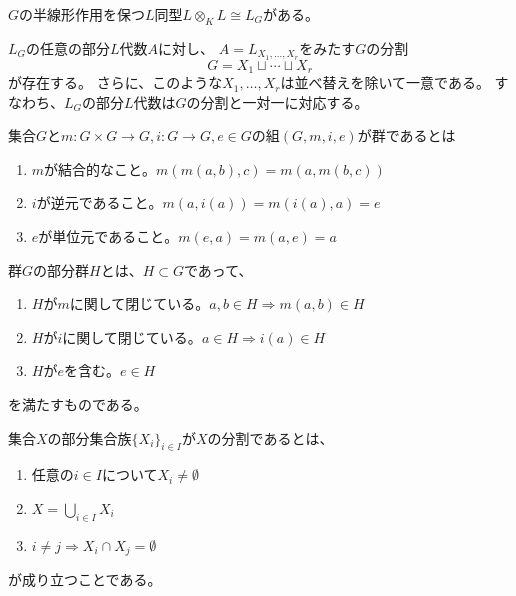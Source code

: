 \begin{proposition}\label{ext-self}
    $G$の半線形作用を保つ$L$同型$L\otimes_KL\cong L_G$がある。
\end{proposition}

\begin{proposition}\label{subalgebra-decomp}
    $L_G$の任意の部分$L$代数$A$に対し、
    $A=L_{X_1,\ldots,X_r}$をみたす$G$の分割$$G=X_1\sqcup \cdots\sqcup X_r$$が存在する。
    さらに、このような$X_1,\ldots,X_r$は並べ替えを除いて一意である。
    すなわち、$L_G$の部分$L$代数は$G$の分割と一対一に対応する。
\end{proposition}

\begin{definition}\label{group-def}
    \leanok
    集合$G$と$m:G\times G\to G, i:G\to G, e\in G$の組$(G,m,i,e)$が群であるとは
    \begin{enumerate}
        \item $m$が結合的なこと。$m(m(a,b),c)=m(a,m(b,c))$
        \item $i$が逆元であること。$m(a,i(a))=m(i(a),a)=e$
        \item $e$が単位元であること。$m(e,a)=m(a,e)=a$
    \end{enumerate}
\end{definition}

\begin{definition}\label{subgroup-def}
    \leanok
    群$G$の部分群$H$とは、$H\subset G$であって、
    \begin{enumerate}
        \item $H$が$m$に関して閉じている。$a,b\in H\Rightarrow m(a,b)\in H$
        \item $H$が$i$に関して閉じている。$a\in H\Rightarrow i(a)\in H$
        \item $H$が$e$を含む。$e\in H$
    \end{enumerate}
    を満たすものである。
\end{definition}

\begin{definition}
    \label{decomposition-def}
    \leanok    
    集合$X$の部分集合族$\{X_i\}_{i\in I}$が$X$の分割であるとは、
    \begin{enumerate}
        \item 任意の$i\in I$について$X_i\neq\emptyset$
        \item $X=\bigcup_{i\in I}X_i$
        \item $i\neq j\Rightarrow X_i\cap X_j=\emptyset$
    \end{enumerate}
    が成り立つことである。
\end{definition}

